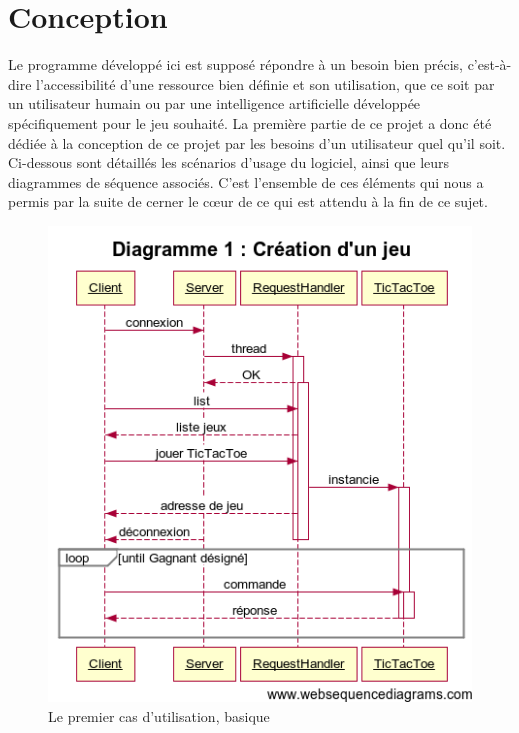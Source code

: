\chapter{Conception}

Le programme développé ici est supposé répondre à un besoin bien précis, c'est-à-dire l'accessibilité d'une ressource bien définie et son utilisation, que ce soit par un utilisateur humain ou par une intelligence artificielle développée spécifiquement pour le jeu souhaité. La première partie de ce projet a donc été dédiée à la conception de ce projet par les besoins d'un utilisateur quel qu'il soit.\\

Ci-dessous sont détaillés les scénarios d'usage du logiciel, ainsi que leurs diagrammes de séquence associés. C'est l'ensemble de ces éléments qui nous a permis par la suite de cerner le cœur de ce qui est attendu à la fin de ce sujet.\\


\begin{figure}[!ht]
	\center
	\includegraphics[scale=0.5]{images/sequence/diagramme_scenario1.png}
	\caption{Le premier cas d'utilisation, basique}
\end{figure}